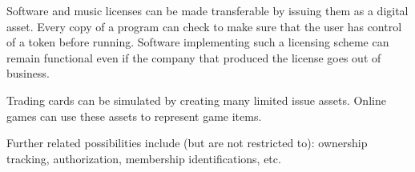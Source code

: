 Software and music licenses can be made transferable by issuing them as a
digital asset. Every copy of a program can check to make sure that the user
has control of a token before running. Software implementing such a licensing
scheme can remain functional even if the company that produced the license goes
out of business.

Trading cards can be simulated by creating many limited issue assets. Online
games can use these assets to represent game items.

Further related possibilities include (but are not restricted to): ownership
tracking, authorization, membership identifications, etc.

